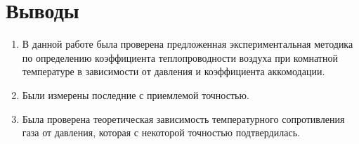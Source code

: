 \documentclass[12pt,a4paper]{article}
\begin{document}
\newpage
\section{Выводы}
	\begin{enumerate}
	\item В данной работе была проверена предложенная экспериментальная методика по определению коэффициента теплопроводности воздуха при комнатной температуре в зависимости от давления и коэффициента аккомодации.
	\item Были измерены последние с приемлемой точностью.
	\item Была проверена теоретическая зависимость температурного сопротивления газа от давления, которая с некоторой точностью подтвердилась. 
	\end{enumerate}
\end{document}
